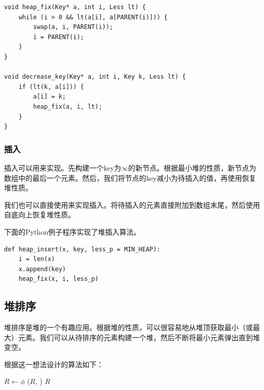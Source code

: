 \documentclass[b5paper]{ctexart}
\begin{document}
\lstset{language=C}
\begin{lstlisting}
void heap_fix(Key* a, int i, Less lt) {
    while (i > 0 && lt(a[i], a[PARENT(i)])) {
        swap(a, i, PARENT(i));
        i = PARENT(i);
    }
}

void decrease_key(Key* a, int i, Key k, Less lt) {
    if (lt(k, a[i])) {
        a[i] = k;
        heap_fix(a, i, lt);
    }
}
\end{lstlisting}

\subsubsection{插入}

插入可以用来实现\cite{CLRS}。先构建一个key为$\infty$的新节点。根据最小堆的性质，新节点为数组中的最后一个元素。然后，我们将节点的key减小为待插入的值，再使用恢复堆性质。

我们也可以直接使用来实现插入。将待插入的元素直接附加到数组末尾，然后使用自底向上恢复堆性质。

\begin{algorithmic}[1]
  \State {}
  \State {}
\EndFunction
\end{algorithmic}

下面的Python例子程序实现了堆插入算法。

\lstset{language=Python}
\begin{lstlisting}
def heap_insert(x, key, less_p = MIN_HEAP):
    i = len(x)
    x.append(key)
    heap_fix(x, i, less_p)
\end{lstlisting}

\subsection{堆排序}
\label{heap-sort}

堆排序是堆的一个有趣应用。根据堆的性质，可以很容易地从堆顶获取最小（或最大）元素。我们可以从待排序的元素构建一个堆，然后不断将最小元素弹出直到堆变空。

根据这一想法设计的算法如下：

\begin{algorithmic}[1]
  \State $R \gets \phi$
  \State {}
    \State {}($R$, )
  \EndWhile
  \State \Return $R$
\EndFunction
\end{algorithmic}
\end{document}
